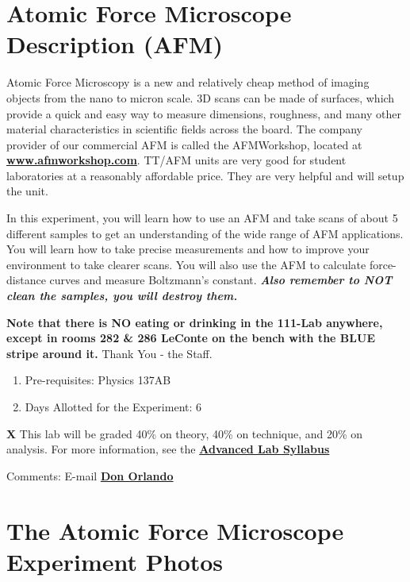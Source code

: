 \documentclass{../lab}
\begin{document}
\maketitle

\tableofcontents

\section{Atomic Force Microscope Description (AFM)}

Atomic Force Microscopy is a new and relatively cheap method of imaging objects from the nano to micron scale.  3D scans can be made of surfaces, which provide a quick and easy way to measure dimensions, roughness, and many other material characteristics in scientific fields across the board. The company provider of our commercial AFM is called the AFMWorkshop, located at \href{http://www.afmworkshop.com/}{\textbf{www.afmworkshop.com}}. TT/AFM units are very good for student laboratories at a reasonably affordable price. They are very helpful and will setup the unit.

In this experiment, you will learn how to use an AFM and take scans of about 5 different samples to get an understanding of the wide range of AFM applications. You will learn how to take precise measurements and how to improve your environment to take clearer scans. You will also use the AFM to calculate force-distance curves and measure Boltzmann's constant. \emph{\textbf{Also remember to NOT clean the samples, you will destroy them.}}

\textbf{Note that there is NO eating or drinking in the 111-Lab anywhere, except in rooms 282 \& 286 LeConte on the bench with the BLUE stripe around it.} Thank You - the Staff.

\begin{enumerate}
    \item Pre-requisites: Physics 137AB

    \item Days Allotted for the Experiment: 6

\end{enumerate}

\textbf{X} This lab will be graded 40\% on theory, 40\% on technique, and 20\% on analysis. For more information, see the \href{\AdvancedLabSyllabus}{\textbf{Advanced Lab Syllabus}}

Comments: E-mail \href{\MailDonOrlando}{\textbf{Don Orlando}}

\section{The Atomic Force Microscope Experiment Photos}
\end{document}
